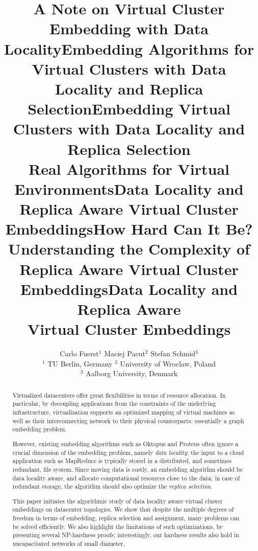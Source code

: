 \documentclass[preprint,12pt]{elsarticle}
\title{A Note on Virtual Cluster Embedding with Data Locality}
\title{Embedding Algorithms for Virtual Clusters with Data Locality and Replica Selection}
\title{Embedding Virtual Clusters with Data Locality and Replica Selection\\{\Large Real Algorithms for Virtual Environments}}
\title{Data Locality and Replica Aware Virtual Cluster Embeddings}
\title{How Hard Can It Be?\\{\Large Understanding the Complexity of  
Replica Aware Virtual Cluster Embeddings}}
\begin{document}
\begin{frontmatter}

\title{Data Locality and Replica Aware\\Virtual Cluster Embeddings}


\author{Carlo Fuerst$^{1}$ \quad Maciej Pacut$^{2}$ \quad Stefan Schmid$^3$\\
{\small $^1$ TU Berlin, Germany \quad $^2$ University of Wroclaw, Poland \\ $^3$ 
Aalborg University, Denmark}}


\begin{abstract}
Virtualized datacenters offer great flexibilities in terms of resource allocation. In particular, by
decoupling applications from the constraints of the underlying infrastructure, virtualization
supports an optimized mapping of virtual machines as well as their interconnecting network
to their
physical counterparts: essentially a graph embedding problem.

However, existing embedding algorithms such as Oktopus and Proteus
often ignore a crucial dimension of the embedding problem, namely \emph{data locality}:
the input to a cloud application such as MapReduce is typically stored in a distributed,
and sometimes redundant, file system. Since moving
data is costly, an embedding algorithm should be data locality aware,
and allocate computational resources close to the data; in case of redundant storage, the algorithm should also optimize the \emph{replica selection}.

This paper initiates the algorithmic study of data locality aware virtual cluster embeddings
on datacenter topologies.
We
show that
despite the multiple degrees of freedom in terms of embedding, replica selection and assignment,
many problems can be
solved efficiently. We also highlight the limitations of such optimizations,
by presenting several NP-hardness proofs; interestingly,
our hardness results also hold in uncapacitated networks of small diameter.
\end{abstract}

\end{frontmatter}

\sloppy

\end{document}
